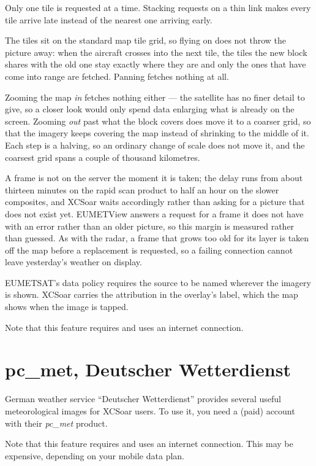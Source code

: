Only one tile is requested at a time.  Stacking requests on a thin
link makes every tile arrive late instead of the nearest one arriving
early.

The tiles sit on the standard map tile grid, so flying on does not
throw the picture away: when the aircraft crosses into the next tile,
the tiles the new block shares with the old one stay exactly where
they are and only the ones that have come into range are fetched.
Panning fetches nothing at all.

Zooming the map \emph{in} fetches nothing either --- the satellite has
no finer detail to give, so a closer look would only spend data
enlarging what is already on the screen.  Zooming \emph{out} past what
the block covers does move it to a coarser grid, so that the imagery
keeps covering the map instead of shrinking to the middle of it.  Each
step is a halving, so an ordinary change of scale does not move it,
and the coarsest grid spans a couple of thousand kilometres.

A frame is not on the server the moment it is taken; the delay runs
from about thirteen minutes on the rapid scan product to half an hour
on the slower composites, and XCSoar waits accordingly rather than
asking for a picture that does not exist yet.  EUMETView answers a
request for a frame it does not have with an error rather than an
older picture, so this margin is measured rather than guessed.  As with the radar, a
frame that grows too old for its layer is taken off the map before a
replacement is requested, so a failing connection cannot leave
yesterday's weather on display.

EUMETSAT's data policy requires the source to be named wherever the
imagery is shown.  XCSoar carries the attribution in the overlay's
label, which the map shows when the image is tapped.

Note that this feature requires and uses an internet connection.

\section{pc\_met, Deutscher Wetterdienst}\label{sec:pcmet}

German weather service ``Deutscher Wetterdienst'' provides several
useful meteorological images for XCSoar users.  To use it, you need a
(paid) account with their \emph{pc\_met} product.

Note that this feature requires and uses an internet connection.  This
may be expensive, depending on your mobile data plan.

